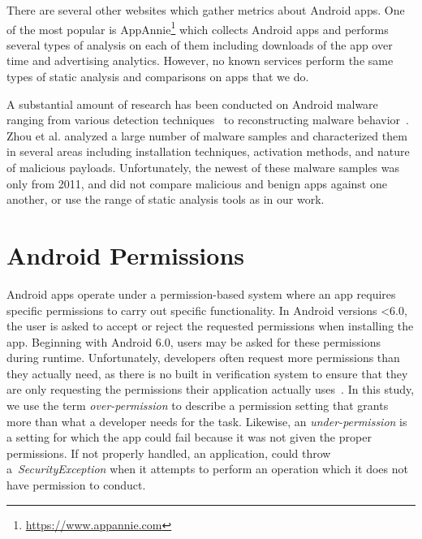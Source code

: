 \documentclass{llncs}
\begin{document}
There are several other websites which gather metrics about Android apps. One of the most popular is AppAnnie\footnote{\url{https://www.appannie.com}} which collects Android apps and performs several types of analysis on each of them including downloads of the app over time and advertising analytics. However, no known services perform the same types of static analysis and comparisons on apps that we do.

A substantial amount of research has been conducted on Android malware ranging from various detection techniques~\cite{6799722, Feng:2014:ASD:2635868.2635869, Rastogi:2013:DEA:2484313.2484355} to reconstructing malware behavior~\cite{reina2013system}. Zhou et al.\cite{zhou2012dissecting} analyzed a large number of malware samples and characterized them in several areas including installation techniques, activation methods, and nature of malicious payloads. Unfortunately, the newest of these malware samples was only from 2011, and did not compare malicious and benign apps against one another, or use the range of static analysis tools as in our work.

\section{Android Permissions}
\label{sec: androidPermissions}

Android apps operate under a permission-based system where an app requires specific permissions to carry out specific functionality. In Android versions \textless 6.0, the user is asked to accept or reject the requested permissions when installing the app. Beginning with Android 6.0, users may be asked for these permissions during runtime. Unfortunately, developers often request more permissions than they actually need, as there is no built in verification system to ensure that they are only requesting the permissions their application actually uses~\cite{Felt:2011:APD:2046707.2046779}. In this study, we use the term \emph{over-permission} to describe a permission setting that grants more than what a developer needs for the task. Likewise, an \emph{under-permission} is a setting for which the app could fail because it was not given the proper permissions. If not properly handled, an application, could throw a~\emph{SecurityException} when it attempts to perform an operation which it does not have permission to conduct.
\end{document}
